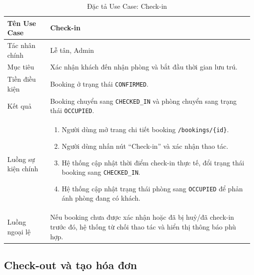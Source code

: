 \documentclass[13pt,a4paper]{extreport}
\begin{document}
\begin{table}[H]
\centering
\caption{Đặc tả Use Case: Check-in}
\label{tab:uc-checkin}
\begin{tabular}{p{4cm}p{10cm}}
\hline
Tên Use Case & Check-in\\
\hline
Tác nhân chính & Lễ tân, Admin\\
Mục tiêu & Xác nhận khách đến nhận phòng và bắt đầu thời gian lưu trú.\\
Tiền điều kiện & Booking ở trạng thái \texttt{CONFIRMED}.\\
Kết quả & Booking chuyển sang \texttt{CHECKED\_IN} và phòng chuyển sang trạng thái \texttt{OCCUPIED}.\\
\hline
Luồng sự kiện chính &
\begin{enumerate}
  \item Người dùng mở trang chi tiết booking \texttt{/bookings/\{id\}}.
  \item Người dùng nhấn nút ``Check-in'' và xác nhận thao tác.
  \item Hệ thống cập nhật thời điểm check-in thực tế, đổi trạng thái booking sang \texttt{CHECKED\_IN}.
  \item Hệ thống cập nhật trạng thái phòng sang \texttt{OCCUPIED} để phản ánh phòng đang có khách.
\end{enumerate}\\
\hline
Luồng ngoại lệ &
Nếu booking chưa được xác nhận hoặc đã bị huỷ/đã check-in trước đó, hệ thống từ chối thao tác và hiển thị thông báo phù hợp.\\
\hline
\end{tabular}
\end{table}

\subsection*{Check-out và tạo hóa đơn}
\end{document}

